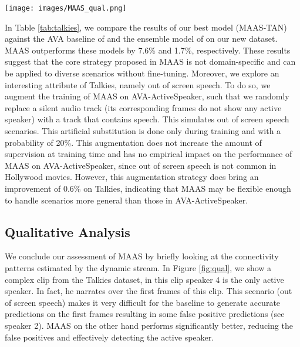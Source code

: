 \documentclass[10pt,twocolumn,letterpaper]{article}
\begin{document}
\begin{figure*}[t!]
    \begin{center}
        \texttt{[image: images/MAAS\_qual.png]}
    \end{center}
    \caption{\textbf{Qualitative Results.} 
    MAAS-TAN includes a dynamic stream that estimates graph structures from nearest neighbours in feature space. The connection patterns in this stream are very diverse and often create edges not present in our static graph. We find that such connectivity allows for information flow between distant audio clips (magenta), inter-speaker relations over multiple time-stamps, and cross-modal arcs that involve nodes in different frames (orange). For easier visualization, we only show a subset of all the dynamic connections.
    }
    \label{fig:qual}
\end{figure*}
 
In Table \ref{tab:talkies}, we compare the results of  our best model (MAAS-TAN) against the AVA baseline of \cite{roth2019ava} and the ensemble model of \cite{alcazar2020active} on our new dataset. MAAS outperforms these models by 7.6\% and 1.7\%, respectively. These results suggest that the core strategy proposed in MAAS is not domain-specific and can be applied to diverse scenarios without fine-tuning. Moreover, we explore an interesting attribute of Talkies, namely out of screen speech. To do so, we augment the training of MAAS on AVA-ActiveSpeaker, such that we randomly replace a silent audio track (its corresponding frames do not show any active speaker) with a track that contains speech. This simulates out of screen speech scenarios. This artificial substitution is done only during training and with a probability of 20\%. This augmentation does not increase the amount of supervision at training time and has no empirical impact on the performance of MAAS on AVA-ActiveSpeaker, since out of screen speech is not common in Hollywood movies. However, this augmentation strategy does bring an improvement of 0.6\% on Talkies, indicating that MAAS may be flexible enough to handle scenarios more general than those in AVA-ActiveSpeaker.


\subsection{Qualitative Analysis}
\label{subsec:qualy}

We conclude our assessment of MAAS by briefly looking at the connectivity patterns estimated by the dynamic stream. In Figure \ref{fig:qual}, we show a complex clip from the Talkies dataset, in this clip speaker 4 is the only active speaker. In fact, he narrates over the first frames of this clip. This scenario (out of screen speech) makes it very difficult for the baseline to generate accurate predictions on the first frames resulting in some false positive predictions (see speaker 2). MAAS on the other hand performs significantly better, reducing the false positives and effectively detecting the active speaker. 
\end{document}

